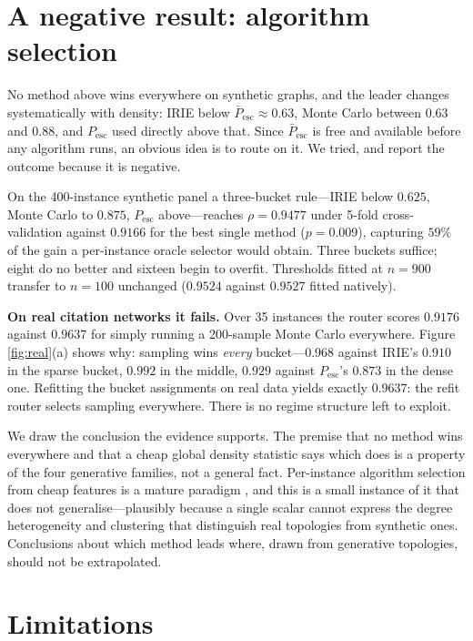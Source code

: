 \documentclass[11pt,a4paper]{article}
\newcommand{\Pesc}{P_{\mathrm{esc}}}
\newcommand{\Pescbar}{\bar{P}_{\mathrm{esc}}}
\begin{document}
\section{A negative result: algorithm selection}
\label{sec:router}

No method above wins everywhere on synthetic graphs, and the leader changes
systematically with density: IRIE below $\Pescbar\approx0.63$, Monte Carlo
between $0.63$ and $0.88$, and $\Pesc$ used directly above that. Since
$\Pescbar$ is free and available before any algorithm runs, an obvious idea is
to route on it. We tried, and report the outcome because it is negative.

On the 400-instance synthetic panel a three-bucket rule---IRIE below $0.625$,
Monte Carlo to $0.875$, $\Pesc$ above---reaches $\rho=0.9477$ under 5-fold
cross-validation against $0.9166$ for the best single method ($p=0.009$),
capturing $59\%$ of the gain a per-instance oracle selector would obtain. Three
buckets suffice; eight do no better and sixteen begin to overfit. Thresholds
fitted at $n=900$ transfer to $n=100$ unchanged ($0.9524$ against $0.9527$ fitted
natively).

\textbf{On real citation networks it fails.} Over 35 instances the router scores
$0.9176$ against $0.9637$ for simply running a 200-sample Monte Carlo
everywhere. Figure \ref{fig:real}(a) shows why: sampling wins \emph{every}
bucket---$0.968$ against IRIE's $0.910$ in the sparse bucket, $0.992$ in the
middle, $0.929$ against $\Pesc$'s $0.873$ in the dense one. Refitting the bucket
assignments on real data yields exactly $0.9637$: the refit router selects
sampling everywhere. There is no regime structure left to exploit.

We draw the conclusion the evidence supports. The premise that no method wins
everywhere and that a cheap global density statistic says which does is a
property of the four generative families, not a general fact. Per-instance
algorithm selection from cheap features is a mature paradigm
\cite{rice76,kotthoff14}, and this is a small instance of it that does not
generalise---plausibly because a single scalar cannot express the degree
heterogeneity and clustering that distinguish real topologies from synthetic
ones. Conclusions about which method leads where, drawn from generative
topologies, should not be extrapolated.

\section{Limitations}
\label{sec:limits}
\end{document}
